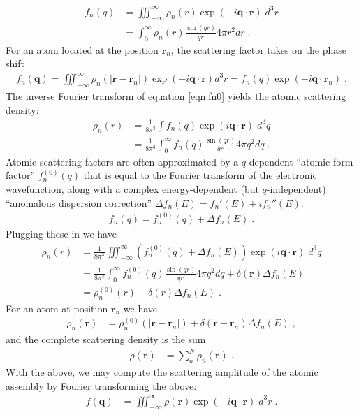 \documentclass[11pt]{article}
\renewcommand{\vec}[1]{\boldsymbol{#1}}
\begin{document}
\begin{align}\label{eqn:fn0}
f_n(q)  &= \iiint_{-\infty}^\infty \rho_n(r) \exp(-i \vec{q}\cdot\vec{r}) \; d^3r \\
  &= \int_0^\infty \rho_n(r)   \frac{\sin(qr)}{qr}  4\pi r^2 dr \; . \label{eqn:form}
\end{align}
For an atom located at the position $\vec{r}_n$, the scattering factor takes on the phase shift
\begin{align}
f_n(\vec{q})  = \iiint_{-\infty}^\infty \rho_n(|\vec{r}-\vec{r}_n|) \exp(-i \vec{q}\cdot\vec{r}) d^3r = f_n(q)
\exp(-i \vec{q}\cdot\vec{r}_n)  \; .
\end{align}
The inverse Fourier transform of equation \ref{eqn:fn0} yields the atomic scattering density:
\begin{align}
\rho_n(r)  &= \frac{1}{8\pi^{3}} \int  f_n(q)  \exp(i \vec{q}\cdot\vec{r}) \; d^3q \\
&= \frac{1}{8\pi^{3}} \int_0^\infty f_n(q)   \frac{\sin(qr)}{qr}  4\pi q^2 dq \; . \label{rhor}
\end{align}
Atomic scattering factors are often approximated by a $q$-dependent ``atomic form factor'' $f_n^{(0)}(q)$  that is 
equal to the Fourier transform of the electronic wavefunction, along with a complex energy-dependent 
(but $q$-independent) ``anomalous dispersion correction'' $\Delta f_n(E) =  f_n'(E) + i f_n''(E)$:
\begin{align}
f_n(q) = f_n^{(0)}(q) + \Delta f_n(E) \; . %
\end{align}
Plugging these in we have
\begin{align}
\rho_n(r)  &= \frac{1}{8\pi^{3}} \iiint_{-\infty}^\infty  (f_n^{(0)}(q) + \Delta f_n(E))   \exp(i \vec{q}\cdot\vec{r}) \; d^3q \\
&=   \frac{1}{8\pi^{3}} \int_0^\infty f_n^{(0)}(q)    \frac{\sin(qr)}{qr}  4\pi q^2 dq + \delta(\vec{r}) \Delta f_n(E) \\
&=   \rho_n^{(0)}(r) + \delta(r) \Delta f_n(E)\; .
\end{align}
For an atom at position $\vec{r}_n$ we have
\begin{align}
\rho_n(\vec{r})  &= \rho_n^{(0)}(|\vec{r}-\vec{r}_n|) +  \delta(\vec{r}-\vec{r}_n) \Delta f_n(E)  \; ,
\end{align}
and the complete scattering density is the sum
\begin{align}
\rho(\vec{r})  &= \sum_n^N \rho_n(\vec{r}) \; .
\end{align}
With the above, we may compute the scattering amplitude of the atomic assembly by Fourier transforming the above:
\begin{align}
f(\vec{q})  &=  \iiint_{-\infty}^\infty \rho(\vec{r}) \exp(-i \vec{q}\cdot\vec{r}) \; d^3r\; .
\end{align}
\end{document}
